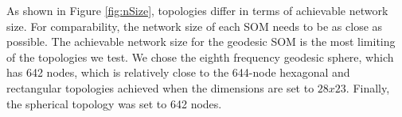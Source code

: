 As shown in Figure \ref{fig:nSize}, topologies differ in terms of achievable
network size.  For comparability, the network size of each SOM needs to be as
close as possible.  The achievable network size for the geodesic SOM is the
most limiting of the topologies we test. We chose the eighth frequency
geodesic sphere, which has 642 nodes, which is relatively close to the
644-node hexagonal and rectangular topologies achieved when the dimensions are
set to \(28x23\). Finally, the spherical topology was set to 642 nodes.



